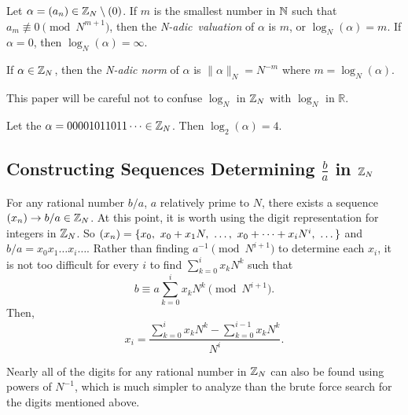 \begin{definition}\label{N-adic-val}
  Let $\alpha=(a_n)\in\mathbb{Z}_N\setminus(0)$. If $m$ is the smallest number in
  $\mathbb{N}$ such that $a_m \not\equiv 0 \pmod{N^{m+1}}$, then the {\em N-adic\ 
  valuation} of $\alpha$ is $m$, or $\log_N(\alpha)=m$. If $\alpha=0$, then
  $\log_N(\alpha)=\infty$.
\end{definition}

\begin{definition}\label{N-adic-norm}
	If $\alpha \in \mathbb{Z}_N$, then the {\em N-adic norm} of $\alpha$ is
  $\lVert \alpha \rVert_N = N^{-m}$ where $m=\log_N(\alpha)$. 
\end{definition}

\par This paper will be careful not to confuse $\log_N$ in $\mathbb{Z}_N$ with 
$\log_N$ in $\mathbb{R}$.

\begin{example}
  Let the $\alpha=00001011011\cdots\in\mathbb{Z}_N$. Then $\log_2(\alpha)=4$.
\end{example}

\subsection{Constructing Sequences Determining $\frac{b}{a}$ in $\mathbb{Z}_N$}

\par For any rational number $b/a$, $a$ relatively prime to $N$, there
exists a sequence $(x_n) \rightarrow b/a \in \mathbb{Z}_N$. At this point, it is
worth using the digit representation for integers in $\mathbb{Z}_N$. So
$\xn=\{x_0, \ x_0+x_1N, \ \dots, \ x_0+\dots+x_iN^i, \ \dots\}$ and
$b/a = x_0x_1\dots x_i\dots$. Rather than finding $a^{-1}\pmod{N^{i+1}}$ to
determine each $x_i$, it is not too difficult for every $i$ to find
$\sum_{k=0}^ix_kN^k$ such that
\begin{equation}\label{eq:seq-rational}
  b \equiv a\sum_{k=0}^ix_kN^k \pmod{N^{i+1}}.
\end{equation}
Then, 
\begin{equation}
  x_i = \frac{\sum_{k=0}^ix_kN^k - \sum_{k=0}^{i-1}x_kN^k}{N^i}.
\end{equation}

\par Nearly all of the digits for any rational number in $\mathbb{Z}_N$ can also be
found using powers of $N^{-1}$, which is much simpler to analyze than the
brute force search for the digits mentioned above.

